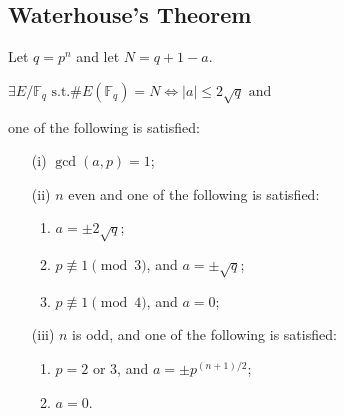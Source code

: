 \documentclass[10pt,handout]{beamer} %
\newcommand{\F}{\mathbb F}
\theoremstyle{definition}
\begin{document}
\subsection{Waterhouse's Theorem}
\begin{frame}[label=current]
\begin{theorem}[Waterhouse]\pause
\label{lem:Water}
 Let $q=p^n$ and let $N = q + 1-a$.\\
\centerline{$\exists E/\F_q\text{ s.t.}\#E(\F_q) = N\Leftrightarrow|a|\le 2\sqrt q\text{ and}$}
 one of the following is satisfied:\pause
\begin{itemize}[<+-| alert@+>]
\item[(i)] $\gcd(a, p) = 1$;
\item[(ii)] $n$ even and one of the following is satisfied:
\begin{enumerate}
  \item $a=\pm 2\sqrt q$;
  \item $p\not\equiv 1 \pmod 3$, and $a = \pm\sqrt q$;
  \item $p\not\equiv 1 \pmod 4$, and $a = 0$;
\end{enumerate}
\item[(iii)] $n$ is odd, and one of the following is satisfied:
 \begin{enumerate}
   \item $p = 2$ or $3$, and $a = \pm p^{(n+1)/2}$;
   \item $a = 0$.
 \end{enumerate}
 \end{itemize}
\end{theorem}



\end{frame}
\end{document}
